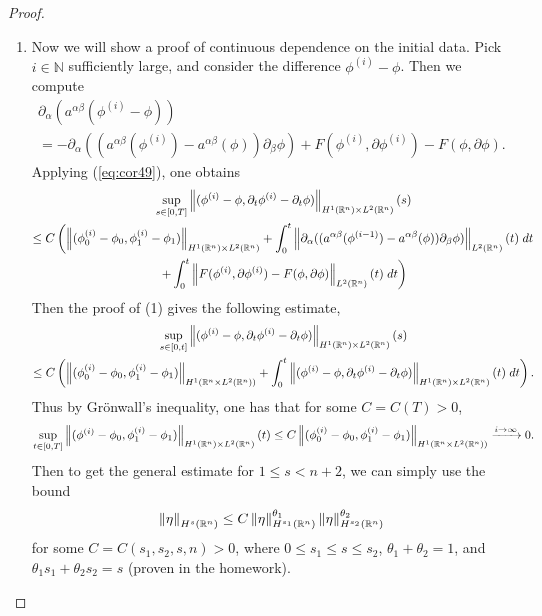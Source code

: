 \documentclass{article}
\begin{document}
\begin{proof}
\begin{enumerate}[itemsep =-2pt,label = (\arabic{*})]
\begin{enumerate}
			\end{enumerate}
		\item Now we will show a proof of continuous dependence on the initial data. Pick $i \in \mathbb{N}$ sufficiently large, and consider the difference $\phi^{(i)} - \phi$. Then we compute 
		\begin{multline*}
				\partial_{\alpha}(a^{\alpha\beta}(\phi^{(i)} - \phi)) \\
				= -\partial_{\alpha}((a^{\alpha\beta}(\phi^{(i)}) - a^{\alpha\beta}(\phi))\partial_{\beta}\phi) + F(\phi^{(i)}, \partial \phi^{(i)}) - F(\phi, \partial \phi). 
		\end{multline*}
		Applying (\ref{eq:cor49}), one obtains 
		\begin{multline*}
			\sup_{s \in [0,T]}\left\Vert (\phi^{(i)} - \phi, \partial_{t}\phi^{(i)} - \partial_{t}\phi) \right\Vert_{H^{1}(\mathbb{R}^{n}) \times L^{2}(\mathbb{R}^{n})}(s) \\
			\leq 
			C\left(\left\Vert (\phi_{0}^{(i)} - \phi_{0},\phi_{1}^{(i)} - \phi_{1}) \right\Vert_{H^{1}(\mathbb{R}^{n}) \times L^{2}(\mathbb{R}^{n})} + \int_{0}^{t}\left\Vert  \partial_{\alpha}((a^{\alpha\beta}(\phi^{(i - 1)}) - a^{\alpha\beta}(\phi))\partial_{\beta}\phi)  \right\Vert_{L^{2}(\mathbb{R}^{n})}(t)\;dt\right. \\
			\left.+ \int_{0}^{t}\left\Vert F(\phi^{(i)}, \partial \phi^{(i)}) - F(\phi,\partial\phi) \right\Vert_{L^{2}(\mathbb{R}^{n})}(t)\;dt\right) 
		\end{multline*} 
		Then the proof of (1) gives the following estimate, 
		\begin{multline*}
			\sup_{s \in [0,t]}\left\Vert  (\phi^{(i)} - \phi,\partial_{t}\phi^{(i)} - \partial_{t}\phi)  \right\Vert_{H^{1}(\mathbb{R}^{n}) \times L^{2}(\mathbb{R}^{n})}(s) \\
			\leq C\left( \left\Vert (\phi_{0}^{(i)} - \phi_{0}, \phi_{1}^{(i)} - \phi_{1}) \right\Vert_{H^{1}(\mathbb{R}^{n} \times L^{2}(\mathbb{R}^{n}))} + \int_{0}^{t}\left\Vert (\phi^{(i)} - \phi, \partial_{t}\phi^{(i)} - \partial_{t}\phi) \right\Vert_{H^{1}(\mathbb{R}^{n}) \times L^{2}(\mathbb{R}^{n})}(t)\;dt \right). 
		\end{multline*} 
		Thus by Gr\"onwall's inequality, one has that for some $C = C(T) > 0$, 
		\begin{equation*}
			\sup_{t \in [0,T]}\left\Vert  (\phi^{(i)} - \phi_{0}, \phi_{1}^{(i)} - \phi_{1})  \right\Vert_{H^{1}(\mathbb{R}^{n}) \times L^{2}(\mathbb{R}^{n})}(t) \leq C\left\Vert (\phi^{(i)}_{0} - \phi_{0}, \phi_{1}^{(i)} - \phi_{1}) \right\Vert_{H^{1}(\mathbb{R}^{n} \times L^{2}(\mathbb{R}^{n}))} \xrightarrow{i \to \infty} 0. 
		\end{equation*}
		Then to get the general estimate for $1 \leq s < n + 2$, we can simply use the bound 
		\begin{equation*}
			\left\Vert \eta \right\Vert_{H^{s}(\mathbb{R}^{n})} \leq C \left\Vert \eta \right\Vert_{H^{s_{1}}(\mathbb{R}^{n})}^{\theta_{1}}\left\Vert \eta \right\Vert_{H^{s_{2}}(\mathbb{R}^{n})}^{\theta_{2}}
		\end{equation*} 
		for some $C = C(s_{1}, s_{2}, s, n) > 0$, where $0 \leq s_{1} \leq s \leq s_{2}$, $\theta_{1} + \theta_{2} = 1$, and $\theta_{1}s_{1} + \theta_{2}s_{2} = s$ (proven in the homework). 
	\end{enumerate}
\end{proof}
\end{document}
